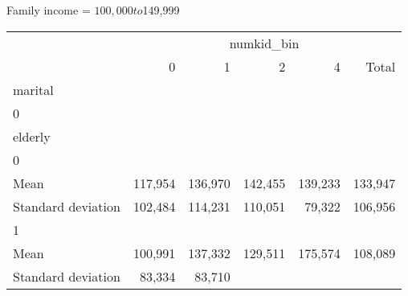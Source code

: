 Family income = $100,000 to $149,999
\begin{tabular}{llllll}
\cline{1-6}
\multicolumn{1}{c}{} &
  \multicolumn{5}{|c}{numkid\_bin} \\
\multicolumn{1}{c}{} &
  \multicolumn{1}{|r}{0} &
  \multicolumn{1}{r}{1} &
  \multicolumn{1}{r}{2} &
  \multicolumn{1}{r}{4} &
  \multicolumn{1}{r}{Total} \\
\cline{1-6}
\multicolumn{1}{l}{marital} &
  \multicolumn{1}{|r}{} &
  \multicolumn{1}{r}{} &
  \multicolumn{1}{r}{} &
  \multicolumn{1}{r}{} &
  \multicolumn{1}{r}{} \\
\multicolumn{1}{l}{\hspace{1em}0} &
  \multicolumn{1}{|r}{} &
  \multicolumn{1}{r}{} &
  \multicolumn{1}{r}{} &
  \multicolumn{1}{r}{} &
  \multicolumn{1}{r}{} \\
\multicolumn{1}{l}{\hspace{2em}elderly} &
  \multicolumn{1}{|r}{} &
  \multicolumn{1}{r}{} &
  \multicolumn{1}{r}{} &
  \multicolumn{1}{r}{} &
  \multicolumn{1}{r}{} \\
\multicolumn{1}{l}{\hspace{3em}0} &
  \multicolumn{1}{|r}{} &
  \multicolumn{1}{r}{} &
  \multicolumn{1}{r}{} &
  \multicolumn{1}{r}{} &
  \multicolumn{1}{r}{} \\
\multicolumn{1}{l}{\hspace{4em}Mean} &
  \multicolumn{1}{|r}{117,954} &
  \multicolumn{1}{r}{136,970} &
  \multicolumn{1}{r}{142,455} &
  \multicolumn{1}{r}{139,233} &
  \multicolumn{1}{r}{133,947} \\
\multicolumn{1}{l}{\hspace{4em}Standard deviation} &
  \multicolumn{1}{|r}{102,484} &
  \multicolumn{1}{r}{114,231} &
  \multicolumn{1}{r}{110,051} &
  \multicolumn{1}{r}{79,322} &
  \multicolumn{1}{r}{106,956} \\
\multicolumn{1}{l}{\hspace{3em}1} &
  \multicolumn{1}{|r}{} &
  \multicolumn{1}{r}{} &
  \multicolumn{1}{r}{} &
  \multicolumn{1}{r}{} &
  \multicolumn{1}{r}{} \\
\multicolumn{1}{l}{\hspace{4em}Mean} &
  \multicolumn{1}{|r}{100,991} &
  \multicolumn{1}{r}{137,332} &
  \multicolumn{1}{r}{129,511} &
  \multicolumn{1}{r}{175,574} &
  \multicolumn{1}{r}{108,089} \\
\multicolumn{1}{l}{\hspace{4em}Standard deviation} &
  \multicolumn{1}{|r}{83,334} &
  \multicolumn{1}{r}{83,710} &

\end{tabular}
